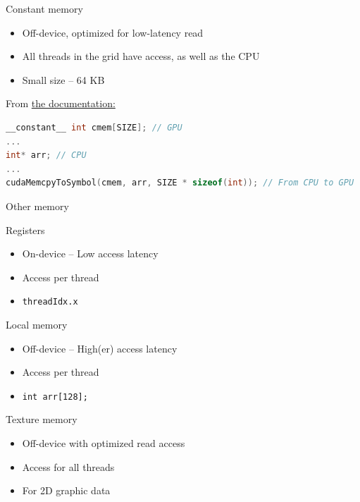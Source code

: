 \documentclass[11pt,t]{beamer}
\newcommand{\inline}[1]{ \colorbox{mygray}{\lstinline{#1}}}
\begin{document}
\begin{frame}[fragile]{Constant memory}

    \begin{itemize}\setlength\itemsep{0.25em}
        \item Off-device, optimized for low-latency read
        \item All threads in the grid have access, as well as the CPU
        \item Small size -- 64 KB
    \end{itemize}
    
    \vspace{4mm}
    From 
    \href{https://docs.nvidia.com/cuda/cuda-runtime-api/group__CUDART__MEMORY.html#group__CUDART__MEMORY_1g9bcf02b53644eee2bef9983d807084c7}{the documentation:}
\begin{lstlisting}[language=C++]
__constant__ int cmem[SIZE]; // GPU
...
int* arr; // CPU
...
cudaMemcpyToSymbol(cmem, arr, SIZE * sizeof(int)); // From CPU to GPU
\end{lstlisting}
    
\end{frame}


\begin{frame}{Other memory}

    \vspace{2mm}
    Registers
    {\footnotesize
    \begin{itemize}
        \item On-device -- Low access latency
        \item Access per thread
        \item \inline{threadIdx.x}
    \end{itemize}
    }
    
    \vspace{2mm}
    Local memory
    {\footnotesize
    \begin{itemize}
        \item Off-device -- High(er) access latency
        \item Access per thread
        \item \inline{int arr[128];}
    \end{itemize}
    }
    
    \vspace{2mm}
    Texture memory
    {\footnotesize
    \begin{itemize}
        \item Off-device with optimized read access
        \item Access for all threads
        \item For 2D graphic data
    \end{itemize}
    }
    
\end{frame}
\end{document}
